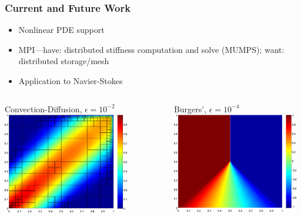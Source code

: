 \documentclass[mathserif]{beamer}
\begin{document}
\begin{frame}
\frametitle{Current and Future Work}
\begin{block}{}
\begin{itemize}
\item Nonlinear PDE support
\item MPI---have: distributed stiffness computation and solve (MUMPS); want: distributed storage/mesh
\item Application to Navier-Stokes
\end{itemize}
\end{block}

\begin{columns}[c]
\begin{column}{5.5cm}
\begin{block}{Convection-Diffusion, $\epsilon=10^{-2}$}
\includegraphics[width=5.5cm]{confusionDemo.png}
\end{block}
\end{column}
\begin{column}{5.5cm}
\begin{block}{Burgers', $\epsilon=10^{-4}$}
\includegraphics[width=5.5cm]{burgers1e4.png}
\end{block}
\end{column}
\end{columns}
\end{frame}


\begin{frame}
\frametitle{}
\begin{block}{}
 \\
\\
\end{block}

\end{frame}

 
\end{document}
